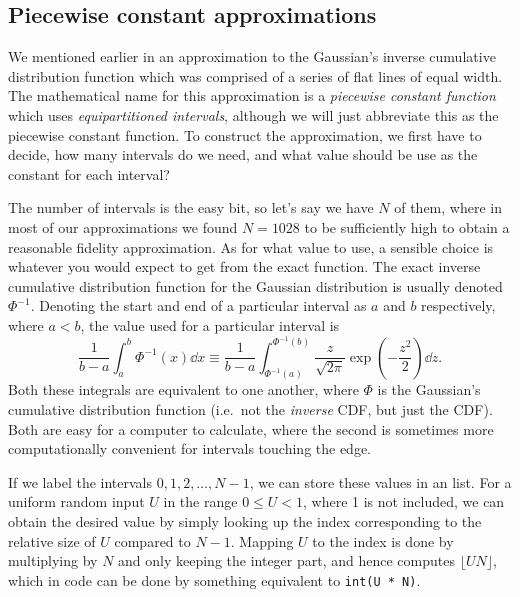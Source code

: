 \documentclass[11pt,a4paper,twoside,english]{extarticle}
\begin{document}
\subsection{Piecewise constant approximations}

We mentioned earlier in  an approximation to the Gaussian's inverse cumulative distribution function which was comprised of a series of flat lines of equal width. The mathematical name for this approximation is a \emph{piecewise constant function} which uses \emph{equipartitioned intervals}, although we will just abbreviate this as the piecewise constant function. To construct the approximation, we first have to decide, how many intervals do we need, and what value should be use as the constant for each interval?

The number of intervals is the easy bit, so let's say we have $ N $ of them, where in most of our approximations we found $ N = 1028 $ to be sufficiently high to obtain a reasonable fidelity approximation. As for what value to use, a sensible choice is whatever you would expect to get from the exact function. The exact inverse cumulative distribution function for the Gaussian distribution is usually denoted $ \Phi^{-1} $. Denoting the start and end of a particular interval as $ a $ and $ b $ respectively, where $ a < b $, the value used for a particular interval is
\begin{equation}
\dfrac{1}{b - a}\int_a^b \Phi^{-1}(x) \dd{x} \equiv \dfrac{1}{b - a} \int_{\Phi^{-1}(a)}^{\Phi^{-1}(b)} \dfrac{z}{\sqrt{2\pi}} \exp(-\dfrac{z^2}{2}) \dd{z}.
\end{equation}
Both these integrals are equivalent to one another, where $ \Phi $ is the Gaussian's cumulative distribution function (i.e.~not the \emph{inverse} CDF, but just the CDF). Both are easy for a computer to calculate, where the second is sometimes more computationally convenient for intervals touching the edge. 

If we label the intervals $ 0, 1, 2,\ldots, N-1 $, we can store these values in an list. For a uniform random input $ U $ in the range $ 0 \leq U < 1 $, where 1 is not included, we can obtain the desired value by simply looking up the index corresponding to the relative size of $ U $ compared to $ N - 1 $. Mapping $ U $ to the index is done by multiplying by $ N $ and only keeping the integer part, and hence computes $ \lfloor U N \rfloor $, which in code can be done by something equivalent to \verb|int(U * N)|.
\end{document}
